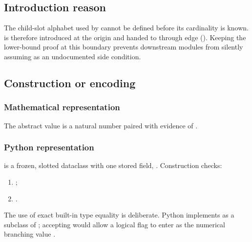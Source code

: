 \subsection{Introduction reason}\label{introduction-reason}

The child-slot alphabet used by \texttt{\protect{}} cannot be defined before
its cardinality is known. \texttt{\protect{}} is therefore introduced at the
origin and handed to \texttt{\protect{}} through edge \texttt{\protect{}}
(\texttt{\protect{}}). Keeping the lower-bound proof at
this boundary prevents downstream modules from silently assuming
\texttt{\protect{}} as an undocumented side condition.

\subsection{Construction or encoding}\label{construction-or-encoding}

\subsubsection{Mathematical
representation}\label{mathematical-representation}

The abstract value is a natural number paired with evidence of
\texttt{\protect{}}.

\subsubsection{Python representation}\label{python-representation}

\texttt{\protect{}} is a frozen, slotted dataclass with one
stored field, \texttt{\protect{}}. Construction checks:

\begin{enumerate}
\def\labelenumi{\arabic{enumi}.}
\tightlist
\item
  \texttt{\protect{}};
\item
  \texttt{\protect{}}.
\end{enumerate}

The use of exact built-in type equality is deliberate. Python implements
\texttt{\protect{}} as a subclass of \texttt{\protect{}}; accepting
\texttt{\protect{}} would allow a logical flag to enter as
the numerical branching value \texttt{\protect{}}.

